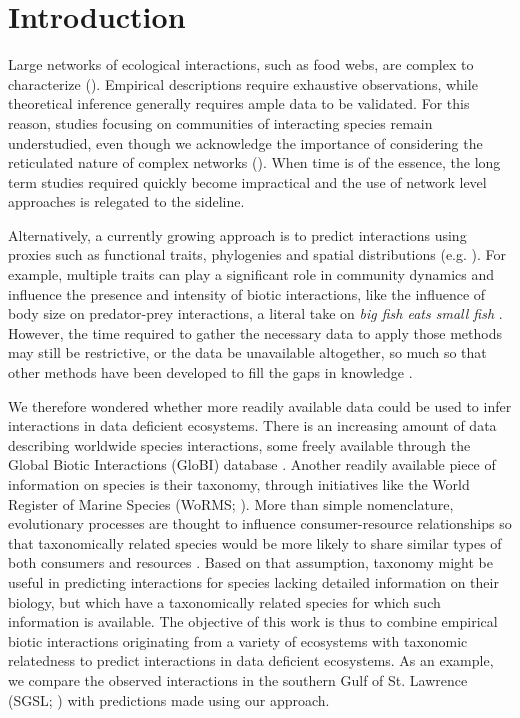 \documentclass[letterpaper]{article}
\begin{document}
\section{Introduction}
Large networks of ecological interactions, such as food webs, are complex to characterize (\cite{Polis1991, Martinez1992, Pascual2006}). Empirical descriptions require exhaustive observations, while theoretical inference generally requires ample data to be validated. For this reason, studies focusing on communities of interacting species remain understudied, even though we acknowledge the importance of considering the reticulated nature of complex networks (\cite{Ings2009, Tylianakis2008}). When time is of the essence, the long term studies required quickly become impractical and the use of network level approaches is relegated to the sideline.

Alternatively, a currently growing approach is to predict interactions using proxies such as functional traits, phylogenies and spatial distributions (e.g. \cite{Morales-Castilla2015, Bartomeus2016}). For example, multiple traits can play a significant role in community dynamics and influence the presence and intensity of biotic interactions, like the influence of body size on predator-prey interactions, a literal take on \emph{big fish eats small fish} \citep{Cohen2003, Brose2006, Gravel2013}. However, the time required to gather the necessary data to apply those methods may still be restrictive, or the data be unavailable altogether, so much so that other methods have been developed to fill the gaps in knowledge \citep[e.g.][]{Schrodt2015}.

We therefore wondered whether more readily available data could be used to infer interactions in data deficient ecosystems. There is an increasing amount of data describing worldwide species interactions, some freely available through the Global Biotic Interactions (GloBI) database \citep{Poelen2014}. Another readily available piece of information on species is their taxonomy, through initiatives like the World Register of Marine Species (WoRMS; \cite{WoRMS2016}). More than simple nomenclature, evolutionary processes are thought to influence consumer-resource relationships \citep{Mouquet2012, Rohr2014} so that taxonomically related species would be more likely to share similar types of both consumers and resources \citep{Eklof2012, Morales-Castilla2015, Gray2015}. Based on that assumption, taxonomy might be useful in predicting interactions for species lacking detailed information on their biology, but which have a taxonomically related species for which such information is available. The objective of this work is thus to combine empirical biotic interactions originating from a variety of ecosystems with taxonomic relatedness to predict interactions in data deficient ecosystems. As an example, we compare the observed interactions in the southern Gulf of St. Lawrence (SGSL; \cite{Savenkoff2004}) with predictions made using our approach.
\end{document}
